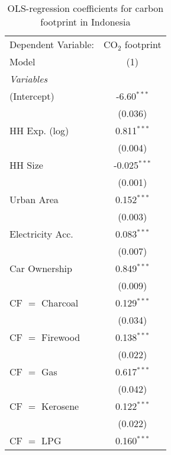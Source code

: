 
\begin{table}[htbp!]
   \centering
   \small
   \begin{adjustbox}{width = 1\textwidth, max height = 0.95\textheight, center}
      \begin{threeparttable}[b]
         \caption{\label{tab:OLS_2_IDN} OLS-regression coefficients for carbon footprint in Indonesia}
         \begin{tabular}{lc}
            \tabularnewline \midrule \midrule
            Dependent Variable: & CO$_{2}$ footprint\\  
            Model               & (1)\\  
            \midrule
            \emph{Variables}\\
            (Intercept)         & -6.60$^{***}$\\   
                                & (0.036)\\   
            HH Exp. (log)       & 0.811$^{***}$\\   
                                & (0.004)\\   
            HH Size             & -0.025$^{***}$\\   
                                & (0.001)\\   
            Urban Area          & 0.152$^{***}$\\   
                                & (0.003)\\   
            Electricity Acc.    & 0.083$^{***}$\\   
                                & (0.007)\\   
            Car Ownership       & 0.849$^{***}$\\   
                                & (0.009)\\   
            CF $=$ Charcoal     & 0.129$^{***}$\\   
                                & (0.034)\\   
            CF $=$ Firewood     & 0.138$^{***}$\\   
                                & (0.022)\\   
            CF $=$ Gas          & 0.617$^{***}$\\   
                                & (0.042)\\   
            CF $=$ Kerosene     & 0.122$^{***}$\\   
                                & (0.022)\\   
            CF $=$ LPG          & 0.160$^{***}$\\   

\end{tabular}
\end{threeparttable}
\end{adjustbox}
\end{table}
